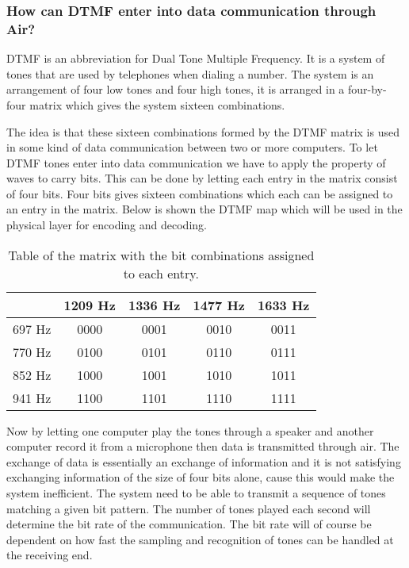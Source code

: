 		\subsubsection{How can DTMF enter into data communication through Air?}
		DTMF is an abbreviation for Dual Tone Multiple Frequency. It is a system of tones that are used by
		telephones when dialing a number. The system is an arrangement of four low tones and four high tones,
		it is arranged in a four-by-four matrix which gives the system sixteen combinations.
		
		The idea is that these sixteen combinations formed by the DTMF matrix is used in some kind of data
		communication between two or more computers. To let DTMF tones enter into data communication we have
		to apply the property of  waves to carry bits. This can be done by letting each entry in the matrix
		consist of four bits. Four bits gives sixteen combinations which each can be assigned to an entry in
		the matrix. Below is shown the DTMF map which will be used in the physical layer for encoding and decoding.
		
		\begin{table}[htb]
			\begin{center}
				\begin{tabular}{c|c c c c}
				 & 1209 Hz & 1336 Hz & 1477 Hz & 1633 Hz \\
				\hline
				697 Hz & 0000 & 0001 & 0010 & 0011 \\
				770 Hz & 0100 & 0101 & 0110 & 0111 \\
				852 Hz & 1000 & 1001 & 1010 & 1011 \\
				941 Hz & 1100 & 1101 & 1110 & 1111 \\
				\end{tabular}
			\end{center}
			\caption{Table of the matrix with the bit combinations assigned to each entry.}
			\label{tab:DTMF_mapping}
		\end{table}
		
		Now by letting one computer play the tones through a speaker and another computer record it from
		a microphone then data is transmitted through air. The exchange of data is essentially an exchange
		of information and it is not satisfying exchanging information of the size of four bits alone,
		cause this would make the system inefficient. The system need to be able to transmit a sequence
		of tones matching a given bit pattern. The number of tones played each second will determine the
		bit rate of the communication. The bit rate will of course be dependent on how fast the sampling and
		recognition of tones can be handled at the receiving end.
		
